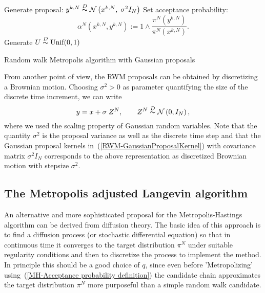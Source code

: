 \IncMargin{1em}
\begin{algorithm}[htb]
\DontPrintSemicolon


\BlankLine

{
  Generate proposal: $ y^{k,N} \stackrel{D}{\thicksim} \mathcal{N}\left(x^{k,N}, \; \sigma^2 I_N\right) $\;
  Set acceptance probability:
  \begin{equation*}
   \alpha^{N} ( x^{k,N}, y^{k,N} ) := 1 \wedge \dfrac{\pi^{N}(y^{k,N}) }{\pi^{N}(x^{k,N})}.    
  \end{equation*}\label{RWMAlgo-AcceptanceProba}
  Generate $ U \stackrel{D}{\thicksim} \text{Unif}(0,1) $\;

}
\caption{Random walk Metropolis algorithm with Gaussian proposals}\label{Algo-RWM}
\end{algorithm}\DecMargin{1em}


\begin{rem}
 From another point of view, the RWM proposals can be obtained by discretizing a Brownian motion. Choosing $ \sigma^2 > 0 $ as parameter quantifying the size of the
discrete time increment, we can write
\begin{equation}
 y = x + \sigma \; Z^N, \qquad Z^N \stackrel{D}{\thicksim} \mathcal{N}\left( 0, I_N \right),
\end{equation}
where we used the scaling property of Gaussian random variables. Note that the quantity $ \sigma^2 $ is the proposal variance as well as the discrete time step and that the Gaussian proposal kernels in~(\ref{RWM-GaussianProposalKernel}) with covariance matrix $ \sigma^2 I_N $ corresponds to the above representation as discretized Brownian motion with stepsize $ \sigma^2 $.
\end{rem}


 

\subsection{The Metropolis adjusted Langevin algorithm}
\label{MH-MALA}

An alternative and more sophisticated proposal for the Metropolis-Hastings algorithm can be derived from diffusion theory. The basic idea of this approach is to find a diffusion process (or stochastic differential equation) so that in continuous time it converges to the target distribution $ \pi^{N} $ under suitable regularity conditions and then to discretize the process to implement the method. In principle this should be a good choice of $q$, since even before 'Metropolizing' using~(\ref{MH-Acceptance probability definition}) the candidate chain approximates the target distribution $ \pi^{N} $ more purposeful than a simple random walk candidate.

